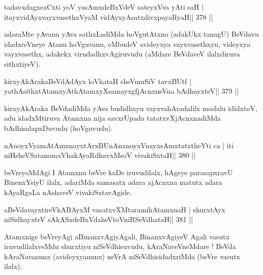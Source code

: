 
\begin{shl}
tadavxdagxcaCxti yoV yasAmxdeBxVdeV sateyxVva yAti saH |
itayxvidAyxvayxvasethxVyaM vidAyxyAsatxdivxpayaRyaH\hfill || 378 ||
\end{shl}

\begin{artha}
adaraMte yAvanu yAva sathxLadiMda hoVgutAtxno (adakUkx tanagU) BeVdavu  idadxreVneye Atanu hoVguvanu, eMbudeV avideyxya vayxvasethxyu, videyxya vayxvasethx, adakekx virudadhxvAgiruvudu (aMdare BeVdaveV ilalxdiruva sithxtiyeV).
\end{artha}

\begin{shl}
kirxyAkArakaBeVdAdAyx loVkataH sheVmuSiV tavxBUtf |
yathAsithxtAtamxyAthAtamxyXsamayxgfjAcnxneVna bAdhayxteV\hfill || 379 ||
\end{shl}

\begin{artha}
kirxyAkAraka BeVdadiMda yAva budidhxyu vayxvahAradalilx modalu  ididxtoV, adu idadxMtiruva Atamxna nija savxrUpada tatatxvXjAcnxnadiMda bAdhisalapxDuvudu (hoVguvudu).
\end{artha}


\begin{shl}
nAnoyxV\s yamAtAmx\s nayxtArxBUnAnxnoyxV\s nayxsAmxtatxtheYti ca |
iti niHsheVSatanomxVhakAyaRdhavxMsoV vivakiSxtaH\hfill || 380 ||
\end{shl}

\begin{artha}
beVreyoMdAgi I Atamxnu beVre kaDe iruvudilalx, hAgeye parasapxravU BinenxYsiyU ilalx, adariMda samasatx adara ajAcnxna matutx adara kAyaRgaLa nAshaveV vivakiSxtavAgide.
\end{artha}

\begin{shl}
aBeVdavayxtireVkABAyxM vasatxvXMtaramihA\s\s tamxnaH |
shurxtAyx niSidhayxteV sAkASxdeBxVdaheVtoVniRSeVdhataH\hfill || 381 ||
\end{shl}

\begin{artha}
Atamxnige beVreyAgi aBinanxvAgiyAgali, BinanxvAgiyeV Agali vasutx  iruvudilalxveMdu shurxtiyu niSeVdhisuvudu, kAraNaveVneMdare ! BeVda kAraNavanunx (avideyxyanunx) neVrA niSeVdhisidadxriMda (beVre vasutx ilalx).
\end{artha}

